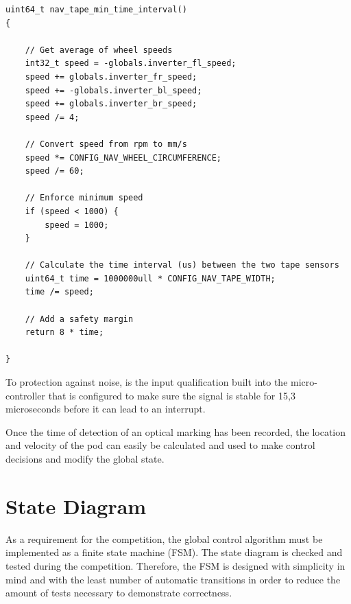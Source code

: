 \begin{verbatim}
uint64_t nav_tape_min_time_interval()
{

    // Get average of wheel speeds
    int32_t speed = -globals.inverter_fl_speed;
    speed += globals.inverter_fr_speed;
    speed += -globals.inverter_bl_speed;
    speed += globals.inverter_br_speed;
    speed /= 4;

    // Convert speed from rpm to mm/s
    speed *= CONFIG_NAV_WHEEL_CIRCUMFERENCE;
    speed /= 60;

    // Enforce minimum speed
    if (speed < 1000) {
        speed = 1000;
    }

    // Calculate the time interval (us) between the two tape sensors
    uint64_t time = 1000000ull * CONFIG_NAV_TAPE_WIDTH;
    time /= speed;

    // Add a safety margin
    return 8 * time;

}
\end{verbatim}

To protection against noise, is the input qualification built into the micro-controller that is configured to make sure the signal is stable for 15,3 microseconds before it can lead to an interrupt.

Once the time of detection of an optical marking has been recorded, the location and velocity of the pod can easily be calculated and used to make control decisions and modify the global state.

\section{State Diagram}

As a requirement for the competition, the global control algorithm must be implemented as a finite state machine (FSM). The state diagram is checked and tested during the competition. Therefore, the FSM is designed with simplicity in mind and with the least number of automatic transitions in order to reduce the amount of tests necessary to demonstrate correctness.

